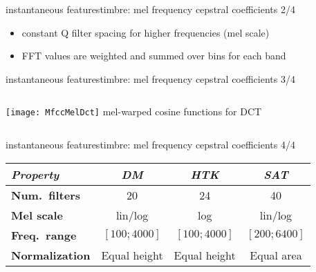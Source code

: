		\begin{frame}{instantaneous features}{timbre: mel frequency cepstral coefficients 2/4}
            
            \begin{itemize}
                \item   constant Q filter spacing for higher frequencies (mel scale)
                \item   FFT values are weighted and summed over bins for each band
            \end{itemize}
		\end{frame}
		\begin{frame}{instantaneous features}{timbre: mel frequency cepstral coefficients 3/4}
			\begin{columns}
                    \texttt{[image: MfccMelDct]}
                    mel-warped cosine functions for DCT
			\end{columns}
		\end{frame}
		\begin{frame}{instantaneous features}{timbre: mel frequency cepstral coefficients 4/4}
			\vspace{-5mm}\begin{footnotesize}
			\begin{table}
				\centering
				\begin{tabular*}{\textwidth}{@{\extracolsep{\fill}}lccc}%
                    \\ \hline
                    \bf{\emph{Property}}	 & \bf{\emph{DM}}	 & \bf{\emph{HTK}}	 & \bf{\emph{SAT}}\\ 
                     \hline
                    \bf{Num.\ filters}	 & 20	 & 24	 & 40\\
                    \bf{Mel scale}	 & lin/log	 & log	 & lin/log\\
                    \bf{Freq.\ range}	 & $[100; 4000]$	 & $[100; 4000]$	 & $[200; 6400]$\\
                    \bf{Normalization}	 & Equal height	 & Equal height	 & Equal area\\
				\end{tabular*}
			\end{table}
			\end{footnotesize}

            \vspace{-5mm}
		\end{frame}

